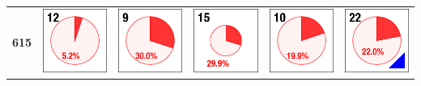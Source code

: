 \begin{table}
\begin{center}
\begin{tabular}{cccccc}
\textbf{615} & \includegraphics{./images/ace_m2_sample_tiles/sample12.png} & \includegraphics{./images/ace_m2_sample_tiles/sample09.png} & \includegraphics{./images/ace_m2_sample_tiles/sample15.png} & \includegraphics{./images/ace_m2_sample_tiles/sample10.png} & \includegraphics{./images/ace_m2_sample_tiles/sample22.png}\\

\end{tabular}
\end{center}
\end{table}
